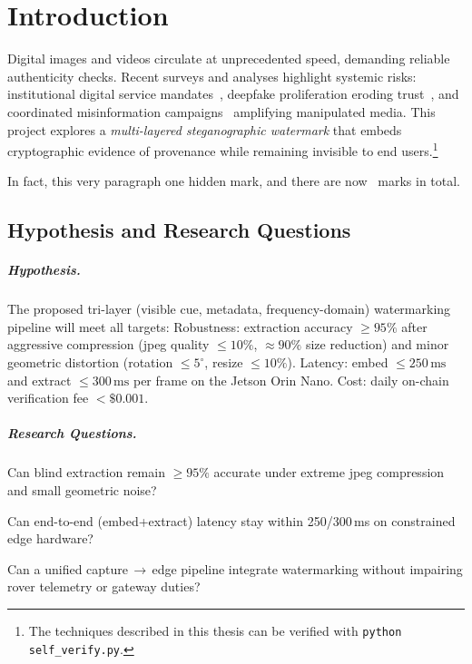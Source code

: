 \chapter{Introduction}
\label{ch:intro}

\newcommand{\wmTotal}{\textbf{\arabic{wmcount}}}

\begin{overview}
    Digital images and videos circulate at unprecedented speed, demanding
    reliable authenticity checks.
    Recent surveys and analyses highlight
    systemic risks: institutional digital service mandates~\cite{ministereDSI2024},
    deepfake proliferation eroding trust~\cite{smith2023deepfakes}, and
    coordinated misinformation campaigns~\cite{doe2024misinfo} amplifying
    manipulated media.
    This project explores a
    \emph{multi-layered steganographic watermark} that embeds cryptographic
    evidence of provenance while remaining invisible to end users.\footnote{%
        The techniques described in this thesis can be verified with
        \texttt{python self\_verify.py}.}

    In fact, this very paragraph  one hidden mark, and
    there are now \wmTotal\ marks in total.
\end{overview}

\chapterdivider

\section{Hypothesis and Research Questions}
\label{sec:intro:hypothesis}

\paragraph{Hypothesis.} The proposed tri-layer (visible cue, metadata, frequency-domain) watermarking pipeline will meet all targets: Robustness: extraction accuracy $\ge 95\%$ after aggressive compression (\gls{jpeg} quality $\le 10\%$, $\approx 90\%$ size reduction) and minor geometric distortion (rotation $\le 5^{\circ}$, resize $\le 10\%$). Latency: embed $\le 250\,\mathrm{ms}$ and extract $\le 300\,\mathrm{ms}$ per frame on the Jetson Orin Nano. Cost: daily on-chain verification fee $<\$0.001$.

\paragraph{Research Questions.}
\begin{description}[leftmargin=2.1cm,style=sameline]
  \item[RQ1] Can blind extraction remain $\ge 95\%$ accurate under extreme \gls{jpeg} compression and small geometric noise?
  \item[RQ2] Can end-to-end (embed+extract) latency stay within 250/300\,ms on constrained edge hardware?
  \item[RQ3] Can a unified capture\,$\rightarrow$\,edge pipeline integrate watermarking without impairing rover telemetry or gateway duties?
\end{description}


